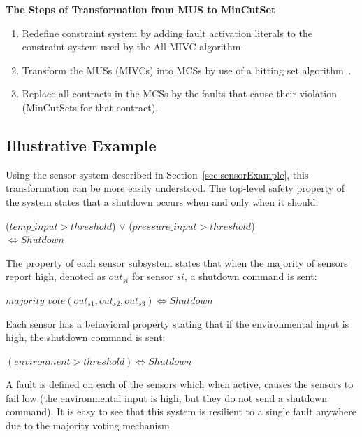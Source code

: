 \textbf{The Steps of Transformation from MUS to MinCutSet}
\begin{enumerate}
\item Redefine constraint system by adding fault activation literals to the constraint system used by the All-MIVC algorithm. %
\item Transform the MUSs (MIVCs) into MCSs by use of a hitting set algorithm~\cite{murakami2013efficient,gainer2017minimal}. 
\item Replace all contracts in the MCSs by the faults that cause their violation (MinCutSets for that contract). 
\end{enumerate}

\subsection{Illustrative Example}
Using the sensor system described in Section~\ref{sec:sensorExample}, this transformation can be more easily understood. The top-level safety property of the system states that a shutdown occurs when and only when it should: 
\begin{center}
    ($temp\_input > threshold$) $\lor$ ($pressure\_input > threshold$)\\
    $\iff Shutdown$
    
\end{center}

The property of each sensor subsystem states that when the majority of sensors report high, denoted as $out_{si}$ for sensor $si$, a shutdown command is sent:
\begin{center}
    $majority\_vote(out_{s1}, out_{s2}, out_{s3}) \iff Shutdown$
    
\end{center}

Each sensor has a behavioral property stating that if the environmental input is high, the shutdown command is sent: 
\begin{center}
    $(environment > threshold) \iff Shutdown$
    
\end{center}

A fault is defined on each of the sensors which when active, causes the sensors to fail low (the environmental input is high, but they do not send a shutdown command). It is easy to see that this system is resilient to a single fault anywhere due to the majority voting mechanism. \\

